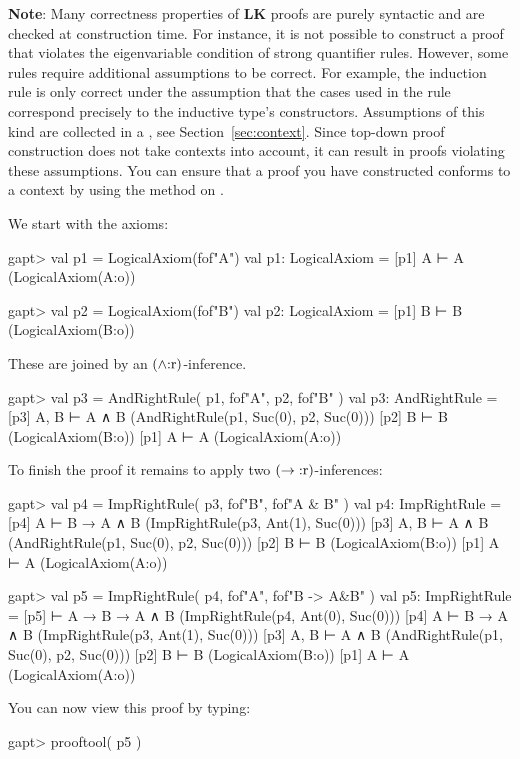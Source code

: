 \documentclass[a4paper,11pt]{book}
\newcommand{\impl}{\to} %
\renewcommand{\land}{\wedge}
\newcommand{\LK}{\textbf{LK}}
\newcommand{\mt}[1]{\textnormal{#1}}
\newcommand{\cli}[1]{{\ttfamily {#1}}}
\begin{document}
\textbf{Note}: Many correctness properties of {\LK} proofs are purely syntactic
and are checked at construction time. For instance, it is not
possible to construct a proof that violates the eigenvariable condition
of strong quantifier rules. However, some rules require additional
assumptions to be correct. For example, the induction rule is only
correct under the assumption that the cases used in the rule
correspond precisely to the inductive type's constructors. Assumptions
of this kind are collected in a \cli{Context}, see Section~\ref{sec:context}.
Since top-down proof construction does not take contexts into account,
it can result in proofs violating these assumptions. You can ensure that
a proof you have constructed conforms to a context \cli{ctx} by using the
\cli{check} method on \cli{ctx}.

We start with the axioms:
%
\begin{clilisting}
gapt> val p1 = LogicalAxiom(fof"A")
val p1: LogicalAxiom = [p1] A ⊢ A    (LogicalAxiom(A:o))

gapt> val p2 = LogicalAxiom(fof"B")
val p2: LogicalAxiom = [p1] B ⊢ B    (LogicalAxiom(B:o))

\end{clilisting}
%
These are joined by an $(\land\mt{:r})$-inference.
\begin{clilisting}
gapt> val p3 = AndRightRule( p1, fof"A", p2, fof"B" )
val p3: AndRightRule = [p3] A, B ⊢ A ∧ B    (AndRightRule(p1, Suc(0), p2, Suc(0)))
[p2] B ⊢ B    (LogicalAxiom(B:o))
[p1] A ⊢ A    (LogicalAxiom(A:o))

\end{clilisting}
%
To finish the proof it remains to apply two $(\impl\mt{:r})$-inferences:
%
\begin{clilisting}
gapt> val p4 = ImpRightRule( p3, fof"B", fof"A & B" )
val p4: ImpRightRule = [p4] A ⊢ B → A ∧ B    (ImpRightRule(p3, Ant(1), Suc(0)))
[p3] A, B ⊢ A ∧ B    (AndRightRule(p1, Suc(0), p2, Suc(0)))
[p2] B ⊢ B    (LogicalAxiom(B:o))
[p1] A ⊢ A    (LogicalAxiom(A:o))

gapt> val p5 = ImpRightRule( p4, fof"A", fof"B -> A&B" )
val p5: ImpRightRule = [p5]  ⊢ A → B → A ∧ B    (ImpRightRule(p4, Ant(0), Suc(0)))
[p4] A ⊢ B → A ∧ B    (ImpRightRule(p3, Ant(1), Suc(0)))
[p3] A, B ⊢ A ∧ B    (AndRightRule(p1, Suc(0), p2, Suc(0)))
[p2] B ⊢ B    (LogicalAxiom(B:o))
[p1] A ⊢ A    (LogicalAxiom(A:o))

\end{clilisting}
%
You can now view this proof by typing:
\begin{clilisting}
gapt> prooftool( p5 )

\end{clilisting}
\end{document}
